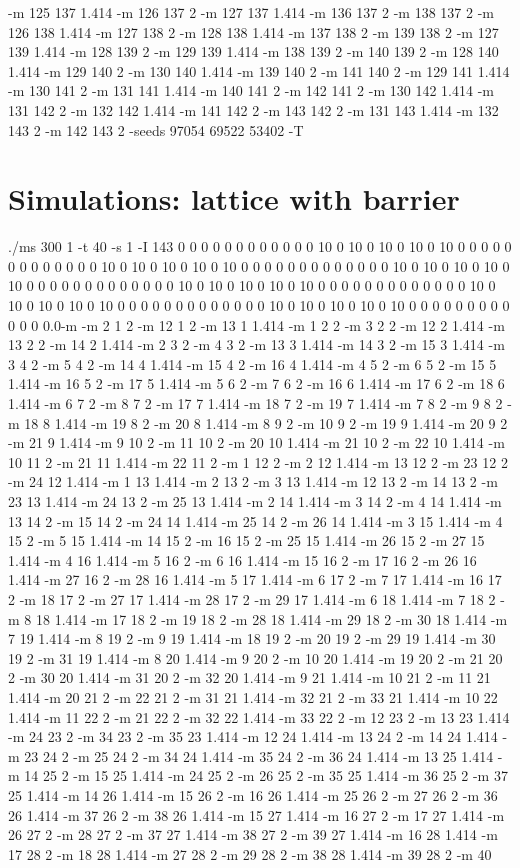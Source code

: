 \documentclass[12pt]{article}
\begin{document}
-m 125 137 1.414 -m 126 137 2 -m 127 137 1.414 -m 136 137 2 -m 138 137 2 -m 126 138 1.414 -m 127 138 2 -m 128 138 1.414 -m 137 138 2 -m 139 138 2 -m 127 139 1.414 -m 128 139 2 -m 129 139 1.414 -m 138 139 2 -m 140 139 2 -m 128 140 1.414 -m 129 140 2 -m 130 140 1.414 -m 139 140 2 -m 141 140 2 -m 129 141 1.414 -m 130 141 2 -m 131 141 1.414 -m 140 141 2 -m 142 141 2 -m 130 142 1.414 -m 131 142 2 -m 132 142 1.414 -m 141 142 2 -m 143 142 2 -m 131 143 1.414 -m 132 143 2 -m 142 143 2 -seeds 97054 69522 53402 -T

\newpage
\section*{Simulations: lattice with barrier}
./ms 300 1 -t 40 -s 1 -I 143 0 0 0 0 0 0 0 0 0 0 0 0 10 0 10 0 10 0 10 0 10 0 0 0 0 0 0 0 0 0 0 0 0 0 10 0 10 0 10 0 10 0 10 0 0 0 0 0 0 0 0 0 0 0 0 0 10 0 10 0 10 0 10 0 10 0 0 0 0 0 0 0 0 0 0 0 0 0 10 0 10 0 10 0 10 0 10 0 0 0 0 0 0 0 0 0 0 0 0 0 10 0 10 0 10 0 10 0 10 0 0 0 0 0 0 0 0 0 0 0 0 0 10 0 10 0 10 0 10 0 10 0 0 0 0 0 0 0 0 0 0 0 0 0.0-m -m 2 1 2 -m 12 1 2 -m 13 1 1.414 -m 1 2 2 -m 3 2 2 -m 12 2 1.414 -m 13 2 2 -m 14 2 1.414 -m 2 3 2 -m 4 3 2 -m 13 3 1.414 -m 14 3 2 -m 15 3 1.414 -m 3 4 2 -m 5 4 2 -m 14 4 1.414 -m 15 4 2 -m 16 4 1.414 -m 4 5 2 -m 6 5 2 -m 15 5 1.414 -m 16 5 2 -m 17 5 1.414 -m 5 6 2 -m 7 6 2 -m 16 6 1.414 -m 17 6 2 -m 18 6 1.414 -m 6 7 2 -m 8 7 2 -m 17 7 1.414 -m 18 7 2 -m 19 7 1.414 -m 7 8 2 -m 9 8 2 -m 18 8 1.414 -m 19 8 2 -m 20 8 1.414 -m 8 9 2 -m 10 9 2 -m 19 9 1.414 -m 20 9 2 -m 21 9 1.414 -m 9 10 2 -m 11 10 2 -m 20 10 1.414 -m 21 10 2 -m 22 10 1.414 -m 10 11 2 -m 21 11 1.414 -m 22 11 2 -m 1 12 2 -m 2 12 1.414 -m 13 12 2 -m 23 12 2 -m 24 12 1.414 -m 1 13 1.414 -m 2 13 2 -m 3 13 1.414 -m 12 13 2 -m 14 13 2 -m 23 13 1.414 -m 24 13 2 -m 25 13 1.414 -m 2 14 1.414 -m 3 14 2 -m 4 14 1.414 -m 13 14 2 -m 15 14 2 -m 24 14 1.414 -m 25 14 2 -m 26 14 1.414 -m 3 15 1.414 -m 4 15 2 -m 5 15 1.414 -m 14 15 2 -m 16 15 2 -m 25 15 1.414 -m 26 15 2 -m 27 15 1.414 -m 4 16 1.414 -m 5 16 2 -m 6 16 1.414 -m 15 16 2 -m 17 16 2 -m 26 16 1.414 -m 27 16 2 -m 28 16 1.414 -m 5 17 1.414 -m 6 17 2 -m 7 17 1.414 -m 16 17 2 -m 18 17 2 -m 27 17 1.414 -m 28 17 2 -m 29 17 1.414 -m 6 18 1.414 -m 7 18 2 -m 8 18 1.414 -m 17 18 2 -m 19 18 2 -m 28 18 1.414 -m 29 18 2 -m 30 18 1.414 -m 7 19 1.414 -m 8 19 2 -m 9 19 1.414 -m 18 19 2 -m 20 19 2 -m 29 19 1.414 -m 30 19 2 -m 31 19 1.414 -m 8 20 1.414 -m 9 20 2 -m 10 20 1.414 -m 19 20 2 -m 21 20 2 -m 30 20 1.414 -m 31 20 2 -m 32 20 1.414 -m 9 21 1.414 -m 10 21 2 -m 11 21 1.414 -m 20 21 2 -m 22 21 2 -m 31 21 1.414 -m 32 21 2 -m 33 21 1.414 -m 10 22 1.414 -m 11 22 2 -m 21 22 2 -m 32 22 1.414 -m 33 22 2 -m 12 23 2 -m 13 23 1.414 -m 24 23 2 -m 34 23 2 -m 35 23 1.414 -m 12 24 1.414 -m 13 24 2 -m 14 24 1.414 -m 23 24 2 -m 25 24 2 -m 34 24 1.414 -m 35 24 2 -m 36 24 1.414 -m 13 25 1.414 -m 14 25 2 -m 15 25 1.414 -m 24 25 2 -m 26 25 2 -m 35 25 1.414 -m 36 25 2 -m 37 25 1.414 -m 14 26 1.414 -m 15 26 2 -m 16 26 1.414 -m 25 26 2 -m 27 26 2 -m 36 26 1.414 -m 37 26 2 -m 38 26 1.414 -m 15 27 1.414 -m 16 27 2 -m 17 27 1.414 -m 26 27 2 -m 28 27 2 -m 37 27 1.414 -m 38 27 2 -m 39 27 1.414 -m 16 28 1.414 -m 17 28 2 -m 18 28 1.414 -m 27 28 2 -m 29 28 2 -m 38 28 1.414 -m 39 28 2 -m 40 
\end{document}
